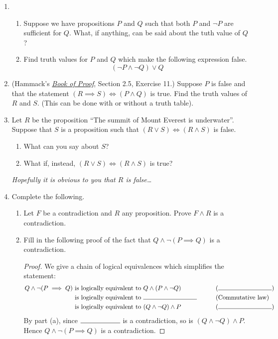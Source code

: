 \begin{enumerate}
  \item \begin{enumerate} \item Suppose we have propositions $P$ and $Q$ such that both $P$ and $\neg P$ are sufficient for $Q$. What, if anything, can be said about the tuth value of $Q$?
  \item Find truth values for $P$ and $Q$ which make the following expression false.
  \[
    (\neg P \land \neg Q) \lor Q
  \]
  \end{enumerate}


  \item (Hammack's \href{http://www.people.vcu.edu/~rhammack/BookOfProof/}{\emph{Book of Proof}}, Section 2.5, Exercise 11.) Suppose $P$ is false and that the statement $(R\implies S) \iff (P \wedge Q)$ is true. Find the truth
values of $R$ and $S$. (This can be done with or without a truth table). 
    
  \item Let $R$ be the proposition ``The summit of Mount Everest is underwater''. Suppose that $S$ is a proposition such that $(R\vee S)\iff (R\wedge S)$ is false.
    \begin{enumerate}
      \item What can you say about $S$?
      \item What if, instead, $(R\vee S)\iff (R\wedge S)$ is true?
    \end{enumerate}
    \emph{Hopefully it is obvious to you that $R$ is false\ldots}
    
    \item Complete the following.
    \begin{enumerate}
      \item Let $F$ be a contradiction and $R$ any proposition. Prove $F \land R$ is a contradiction.
      \item Fill in the following proof of the fact that $Q \land \neg (P \implies Q)$ is a contradiction. 
  
      \begin{proof}
        We give a chain of logical equivalences which simplifies the statement:
        \begin{alignat*}{3}
          Q \land \neg (P \implies Q) &\text{ is logically equivalent to } Q \land (P \land \neg Q) \qquad &&(\rule{3cm}{0.15mm})\\
          &\text{ is logically equivalent to } \rule{3cm}{0.15mm} \qquad &&(\text{Commutative law}) \\
          &\text{ is logically equivalent to } (Q \land \neg Q) \land P \qquad &&(\rule{3cm}{0.15mm})
        \end{alignat*}
        By part (a), since $\rule{2cm}{0.15mm}$ is a contradiction, so is $(Q \land \neg Q) \land P$. Hence $Q \land \neg (P \implies Q)$ is a contradiction.
       \end{proof}
    \end{enumerate}
    

\end{enumerate}
